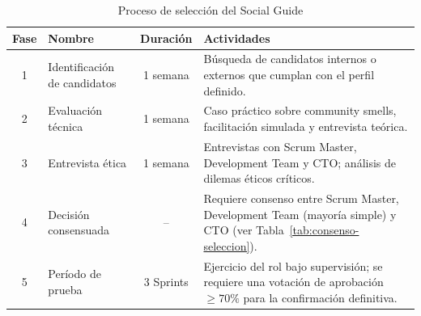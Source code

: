 \begin{table}[h]
    \centering
    \small
    \begin{tabularx}{\textwidth}{|c|l|c|X|}
        \hline
        \textbf{Fase} & \textbf{Nombre}                                                                                                         & \textbf{Duración} & \textbf{Actividades} \\
        \hline
        1             & Identificación de candidatos                                                                                            & 1 semana
                      & Búsqueda de candidatos internos o externos que cumplan con el perfil definido.                                                                                     \\
        \hline
        2             & Evaluación técnica                                                                                                      & 1 semana
                      & Caso práctico sobre community smells, facilitación simulada y entrevista teórica.                                                                                  \\
        \hline
        3             & Entrevista ética                                                                                                        & 1 semana
                      & Entrevistas con Scrum Master, Development Team y CTO; análisis de dilemas éticos críticos.                                                                         \\
        \hline
        4             & Decisión consensuada                                                                                                    & --
                      & Requiere consenso entre Scrum Master, Development Team (mayoría simple) y CTO (ver Tabla~\ref{tab:consenso-seleccion}).                                            \\
        \hline
        5             & Período de prueba                                                                                                       & 3 Sprints
                      & Ejercicio del rol bajo supervisión; se requiere una votación de aprobación $\geq 70\%$ para la confirmación definitiva.                                            \\
        \hline
    \end{tabularx}
    \caption{Proceso de selección del Social Guide}
    \label{tab:seleccion-social-guide}
\end{table}

